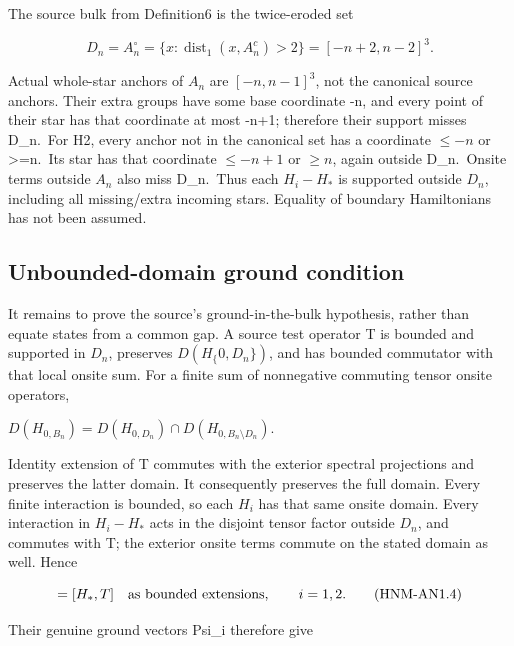 The source bulk from Definition6 is the twice-eroded set

\begin{equation}
D_n=A_n^\circ=\{x:\operatorname{dist}_1(x,A_n^c)>2\}
=[-n+2,n-2]^3.
\tag{HNM-AN1.3}
\label{r29:an1:eq3}
\end{equation}

Actual whole-star anchors of \(A_n\) are \([-n,n-1]^{3}\), not the canonical source anchors. Their extra groups have some base coordinate -n, and every point of their star has that coordinate at most -n+1; therefore their support misses D\_n.~For H2, every anchor not in the canonical set has a coordinate \(\le -n\) or \textgreater=n.~Its star has that coordinate \(\le -n+1\) or \(\ge n\), again outside D\_n.~Onsite terms outside \(A_n\) also miss D\_n.~Thus each \(H_i-H_*\) is supported outside \(D_n\), including all missing/extra incoming stars. Equality of boundary Hamiltonians has not been assumed.

\hypertarget{r29-an1-unbounded-domain-ground-condition}{%
\subsection{Unbounded-domain ground condition}\label{r29:an1:r29-an1-unbounded-domain-ground-condition}}

It remains to prove the source's ground-in-the-bulk hypothesis, rather than equate states from a common gap. A source test operator T is bounded and supported in \(D_n\), preserves \(D(H_\{0,D_n\})\), and has bounded commutator with that local onsite sum. For a finite sum of nonnegative commuting tensor onsite operators,

\(D(H_{0,B_n})=D(H_{0,D_n})\cap D(H_{0,B_n\setminus D_n})\).

Identity extension of T commutes with the exterior spectral projections and preserves the latter domain. It consequently preserves the full domain. Every finite interaction is bounded, so each \(H_i\) has that same onsite domain. Every interaction in \(H_i-H_*\) acts in the disjoint tensor factor outside \(D_n\), and commutes with T; the exterior onsite terms commute on the stated domain as well. Hence

\begin{equation}
[H_i,T]=[H_*,T]\quad\hbox{as bounded extensions},\qquad i=1,2.
\tag{HNM-AN1.4}
\label{r29:an1:eq4}
\end{equation}

Their genuine ground vectors Psi\_i therefore give

